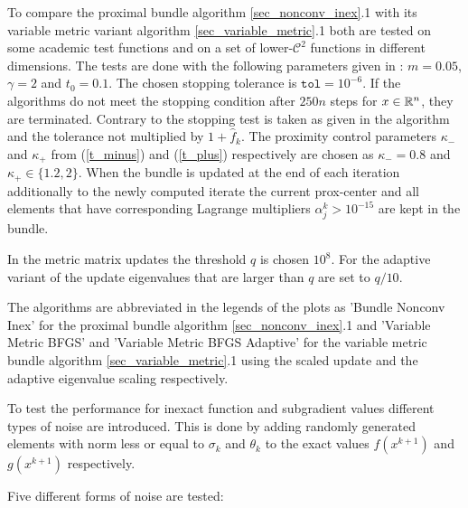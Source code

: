 To compare the proximal bundle algorithm \ref{sec_nonconv_inex}.1 with its variable metric variant algorithm  \ref{sec_variable_metric}.1 both are tested on some academic test functions and on a set of lower-\(\mathcal{C}^2\) functions in different dimensions.
The tests are done with the following parameters given in \cite{Hare2016}: \(m = 0.05\), \(\gamma = 2\) and \(t_0 = 0.1\). The chosen stopping tolerance is \(\mathtt{tol} = 10^{-6}\). If the algorithms do not meet the stopping condition after \(250n\) steps for \(x \in \mathbb{R}^n\), they are terminated. Contrary to \cite{Hare2016} the stopping test is taken as given in the algorithm and the tolerance not multiplied by \(1+\hat{f}_k\).
The proximity control parameters \(\kappa_-\) and \(\kappa_+\) from (\ref{t_minus}) and (\ref{t_plus}) respectively are chosen as \(\kappa_-= 0.8\) and \(\kappa_+\in\{1.2,2\}\).
When the bundle is updated at the end of each iteration additionally to the newly computed iterate the current prox-center and all elements that have corresponding Lagrange multipliers \(\alpha_j^k > 10^{-15}\) are kept in the bundle.

In the metric matrix updates the threshold \(q\) is chosen \(10^{8}\).
For the adaptive variant of the update eigenvalues that are larger than \(q\) are set to \(q/10\).

The algorithms are abbreviated in the legends of the plots as 'Bundle Nonconv Inex' for the proximal bundle algorithm \ref{sec_nonconv_inex}.1 and 'Variable Metric BFGS' and 'Variable Metric BFGS Adaptive' for the variable metric bundle algorithm \ref{sec_variable_metric}.1 using the scaled update and the adaptive eigenvalue scaling respectively.




To test the performance for inexact function and subgradient values different types of noise are introduced. This is done by adding randomly generated elements with norm less or equal to \(\sigma_k\) and \(\theta_k\) to the exact values \(f(x^{k+1})\) and \(g(x^{k+1})\) respectively.

Five different forms of noise are tested:


